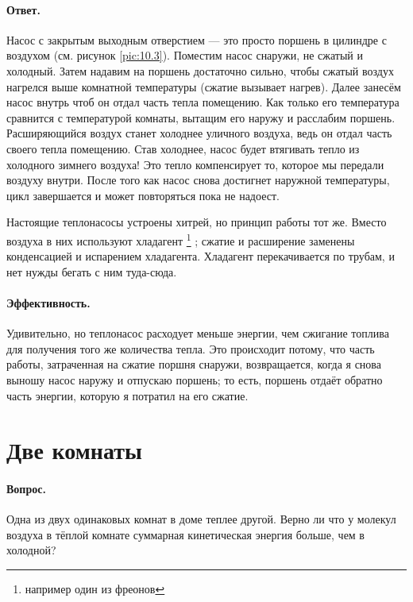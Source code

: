 \paragraph{Ответ.}
Насос с закрытым выходным отверстием --- это просто поршень в цилиндре с воздухом (см. рисунок \ref{pic:10.3}).
Поместим насос снаружи, не сжатый и холодный.
Затем надавим на поршень достаточно сильно, чтобы сжатый воздух нагрелся выше комнатной температуры (сжатие вызывает нагрев).
Далее занесём насос внутрь чтоб он отдал часть тепла помещению.
Как только его температура сравнится с температурой комнаты, вытащим его наружу и расслабим поршень.
Расширяющийся воздух станет холоднее уличного воздуха, ведь он отдал часть своего тепла помещению.
Став холоднее, насос будет втягивать тепло из холодного зимнего воздуха!
Это тепло компенсирует то, которое мы передали воздуху внутри.
После того как насос снова достигнет наружной температуры, цикл завершается и может повторяться пока не надоест.

Настоящие теплонасосы устроены хитрей, но принцип работы тот же.
Вместо воздуха в них используют хладагент%
\footnote{например один из фреонов \pr}%
; сжатие и расширение заменены конденсацией и испарением хладагента.
Хладагент перекачивается по трубам, и нет нужды бегать с ним туда-сюда.

\paragraph{Эффективность.}
Удивительно, но теплонасос расходует меньше энергии, чем сжигание топлива для получения того же количества тепла.
Это происходит потому, что часть работы, затраченная на сжатие поршня снаружи, возвращается, когда я снова выношу насос наружу и отпускаю поршень; то есть, поршень отдаёт обратно часть энергии, которую я потратил на его сжатие.

\section{Две комнаты}

\paragraph{Вопрос.}
Одна из двух одинаковых комнат в доме теплее другой.
Верно ли что у молекул воздуха в тёплой комнате
суммарная кинетическая энергия больше, чем в холодной?

